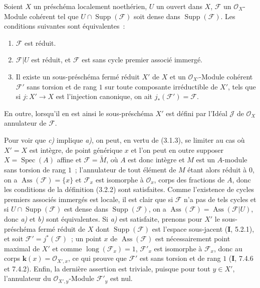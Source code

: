 \begin{proposition}[3.2.3]
\label{IV.2.3.2.3-fr}
Soient $X$ un préschéma localement noethérien, $U$ un ouvert dans $X$,
$\mathcal F$ un $\mathcal O_X$-Module cohérent tel que
$U\cap\operatorname{Supp}(\mathcal F)$ soit dense dans
$\operatorname{Supp}(\mathcal F)$. Les conditions suivantes sont
équivalentes~:
\begin{enumerate}
\item[\emph{a)}] $\mathcal F$ est réduit.
\item[\emph{b)}] $\mathcal F|U$ est réduit, et $\mathcal F$ est sans cycle
premier associé immergé.
\item[\emph{c)}] Il existe un sous-préschéma fermé réduit $X'$ de $X$ et un
$\mathcal O_{X'}$-Module cohérent $\mathcal F'$ sans torsion et de rang $1$
sur toute composante irréductible de $X'$, tels que si $j:X'\to X$ est
l'injection canonique, on ait $j_*(\mathcal F')=\mathcal F$.
\end{enumerate}
En outre, lorsqu'il en est ainsi le sous-préschéma $X'$ est défini par l'Idéal
$\mathcal J$ de $\mathcal O_X$ annulateur de $\mathcal F$.
\end{proposition}

Pour voir que \emph{c)} implique \emph{a)}, on peut, en vertu de (3.1.3), se
limiter au cas où $X'=X$ est intègre, de point générique $x$ et l'on peut en
outre supposer $X=\operatorname{Spec}(A)$ affine et
$\mathcal F=\widetilde M$, où $A$ est donc intègre et $M$ est un $A$-module
sans torsion de rang $1$~; l'annulateur de tout élément de $M$ étant alors
réduit à $0$, on a $\operatorname{Ass}(\mathcal F)=\{x\}$ et
$\mathcal F_x$ est isomorphe à $\mathcal O_x$, corps des fractions de $A$,
donc les conditions de la définition (3.2.2) sont satisfaites. Comme
l'existence de cycles premiers associés immergés est locale, il est clair que
si $\mathcal F$ n'a pas de tels cycles et si
$U\cap\operatorname{Supp}(\mathcal F)$ est dense dans
$\operatorname{Supp}(\mathcal F)$, on a
$\operatorname{Ass}(\mathcal F)=\operatorname{Ass}(\mathcal F|U)$, donc
\emph{a)} et \emph{b)} sont équivalentes. Si \emph{a)} est satisfaite,
prenons pour $X'$ le sous-préschéma fermé réduit de $X$ dont
$\operatorname{Supp}(\mathcal F)$ est l'espace sous-jacent (\textbf{I}, 5.2.1), et soit
$\mathcal F'=j^*(\mathcal F)$~; un point $x$ de
$\operatorname{Ass}(\mathcal F)$ est nécessairement point maximal de $X'$ et
comme $\operatorname{long}(\mathcal F_x)=1$, $\mathcal F'_x$ est isomorphe à
$\mathcal F_x$, donc au corps $\boldsymbol{k}(x)=\mathcal O_{X',x}$, ce qui prouve que
$\mathcal F'$ est sans torsion et de rang $1$ (\textbf{I}, 7.4.6 et 7.4.2). Enfin, la
dernière assertion est triviale, puisque pour tout $y\in X'$, l'annulateur du
$\mathcal O_{X',y}$-Module $\mathcal F'_y$ est nul.


